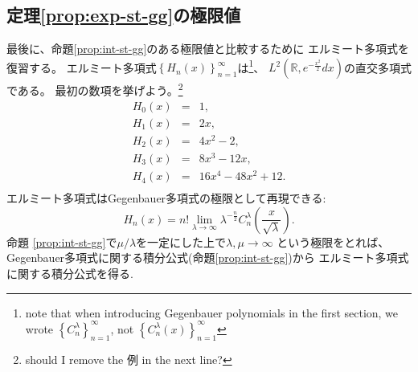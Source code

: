 \subsection{定理\ref{prop:exp-st-gg}の極限値}
最後に、命題\ref{prop:int-st-gg}のある極限値と比較するために
エルミート多項式を復習する。
エルミート多項式$\left\{ H_n(x) \right\}_{n=1}^\infty$は\footnote{note that when introducing Gegenbauer polynomials in the first
	section, we wrote $\left\{ C^\lambda_n \right\}_{n=1}^{\infty}$, not $\left\{ C^{\lambda}_n(x) \right\}_{n=1}^\infty$}、
	$L^2\left( \mathbb{R},e^{-\frac{x^2}{2}}dx \right)$の直交多項式である。
	最初の数項を挙げよう。\footnote{should I remove the 例 in the next line?}
		\begin{eqnarray*}
		H_0(x)&=& 1,\\
		H_1(x)&=& 2x,\\
		H_2(x)&=& 
		4x^2-2,\\
		H_3(x)&=& 8x^3-12x,\\
		H_4(x)&=& 16x^4-48x^2+12.\\
		\end{eqnarray*}
	エルミート多項式はGegenbauer多項式の極限として再現できる:
	\begin{equation*}
			H_n (x) = n! \lim_{\lambda \rightarrow \infty} \lambda^{- \frac{n}{2}}
			C_n^{\lambda} \left( \frac{x}{\sqrt{\lambda}} \right).
	\end{equation*}
	命題 \ref{prop:int-st-gg}で$\mu/\lambda$を一定にした上で$\lambda,\mu\to\infty$ 
	という極限をとれば、Gegenbauer多項式に関する積分公式(命題\ref{prop:int-st-gg})から
	エルミート多項式に関する積分公式を得る.
